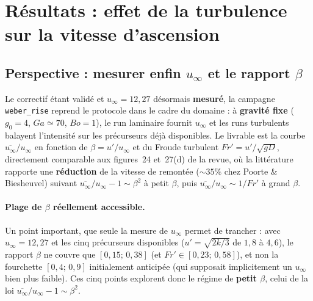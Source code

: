 \section{Résultats : effet de la turbulence sur la vitesse d'ascension}

\subsection{Perspective : mesurer enfin \texorpdfstring{$u_\infty$}{u\_inf} et le rapport
\texorpdfstring{$\beta$}{beta}}

Le correctif étant validé et $u_\infty = 12{,}27$ désormais \textbf{mesuré}, la
campagne \texttt{weber\_rise} reprend le protocole dans le cadre du domaine
\cite{legendre2025} : à \textbf{gravité fixe} ($g_0=4$, $Ga\simeq70$, $Bo=1$), le
run laminaire fournit $u_\infty$ et les runs turbulents balayent l'intensité sur les
précurseurs déjà disponibles. Le livrable est la courbe
$\overline{u_\infty}/u_\infty$ en fonction de $\beta = u'/u_\infty$ et du Froude
turbulent $Fr' = u'/\sqrt{gD}$, directement comparable aux figures~24 et~27(d) de la
revue, où la littérature rapporte une \textbf{réduction} de la vitesse de remontée
(${\sim}35\%$ chez Poorte \& Biesheuvel) suivant
$\overline{u_\infty}/u_\infty - 1 \sim \beta^2$ à petit $\beta$, puis
$\overline{u_\infty}/u_\infty \sim 1/Fr'$ à grand $\beta$.

\paragraph{Plage de $\beta$ réellement accessible.} Un point important, que seule la
mesure de $u_\infty$ permet de trancher : avec $u_\infty=12{,}27$ et les cinq
précurseurs disponibles ($u' = \sqrt{2k/3}$ de $1{,}8$ à $4{,}6$), le rapport
$\beta$ ne couvre que $[0{,}15;\,0{,}38]$ (et $Fr'\in[0{,}23;\,0{,}58]$), et non la
fourchette $[0{,}4;\,0{,}9]$ initialement anticipée (qui supposait implicitement
un $u_\infty$ bien plus faible). Ces cinq points explorent donc le régime de
\textbf{petit $\beta$}, celui de la loi
$\overline{u_\infty}/u_\infty - 1 \sim \beta^2$.

